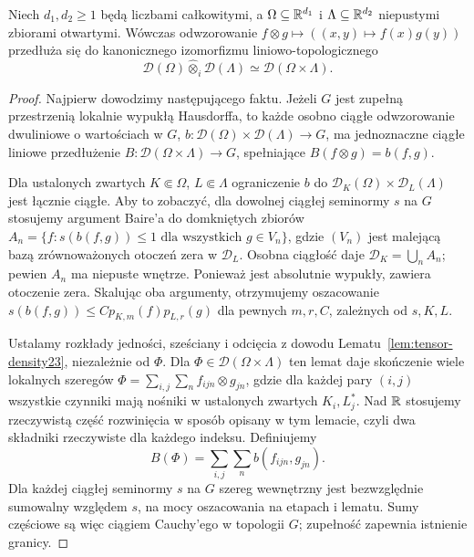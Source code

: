 \begin{twierdzenie}
\label{thm:D-i-product24}
Niech $d_1,d_2\ge1$ będą liczbami całkowitymi, a
$\Omega\subseteq\mathbb R^{d_1}$ i $\Lambda\subseteq\mathbb R^{d_2}$
niepustymi zbiorami otwartymi. Wówczas odwzorowanie
$f\otimes g\mapsto ((x,y)\mapsto f(x)g(y))$ przedłuża się
do kanonicznego izomorfizmu liniowo-topologicznego
\[
 \mathcal D(\Omega)\widehat\otimes_i\mathcal D(\Lambda)
 \simeq \mathcal D(\Omega\times\Lambda).
\]
\end{twierdzenie}
\begin{proof}
Najpierw dowodzimy następującego faktu. Jeżeli $G$ jest
zupełną przestrzenią lokalnie wypukłą Hausdorffa, to każde
osobno ciągłe odwzorowanie dwuliniowe o wartościach w $G$,
$b:\mathcal D(\Omega)\times\mathcal D(\Lambda)\to G$,
ma jednoznaczne ciągłe liniowe przedłużenie
$B:\mathcal D(\Omega\times\Lambda)\to G$, spełniające
$B(f\otimes g)=b(f,g)$.

Dla ustalonych zwartych $K\Subset\Omega$,
$L\Subset\Lambda$ ograniczenie $b$ do
$\mathcal D_K(\Omega)\times\mathcal D_L(\Lambda)$ jest
łącznie ciągłe. Aby to zobaczyć, dla dowolnej ciągłej
seminormy $s$ na $G$ stosujemy argument Baire'a
do domkniętych zbiorów
$A_n=\{f:s(b(f,g))\le1\text{ dla wszystkich }g\in V_n\}$,
gdzie $(V_n)$ jest malejącą bazą zrównoważonych otoczeń
zera w $\mathcal D_L$. Osobna ciągłość daje
$\mathcal D_K=\bigcup_n A_n$; pewien $A_n$ ma niepuste
wnętrze. Ponieważ jest absolutnie wypukły, zawiera
otoczenie zera. Skalując oba argumenty, otrzymujemy oszacowanie
$s(b(f,g))\le C p_{K,m}(f)p_{L,r}(g)$ dla pewnych
$m,r,C$, zależnych od $s,K,L$.

Ustalamy rozkłady jedności, sześciany i odcięcia
z dowodu Lematu~\ref{lem:tensor-density23}, niezależnie
od $\Phi$. Dla $\Phi\in\mathcal D(\Omega\times\Lambda)$
ten lemat daje skończenie wiele lokalnych szeregów
$\Phi=\sum_{i,j}\sum_n f_{ijn}\otimes g_{jn}$,
gdzie dla każdej pary $(i,j)$ wszystkie czynniki
mają nośniki w ustalonych zwartych $K_i,L_j^*$.
Nad $\mathbb R$ stosujemy rzeczywistą część rozwinięcia
w sposób opisany w tym lemacie, czyli dwa składniki
rzeczywiste dla każdego indeksu.
Definiujemy
\[
 B(\Phi)=\sum_{i,j}\sum_n b(f_{ijn},g_{jn}).
\]
Dla każdej ciągłej seminormy $s$ na $G$ szereg
wewnętrzny jest bezwzględnie sumowalny względem $s$,
na mocy oszacowania na etapach i lematu.
Sumy częściowe są więc ciągiem Cauchy'ego
w topologii $G$; zupełność zapewnia istnienie granicy.


\end{proof}
